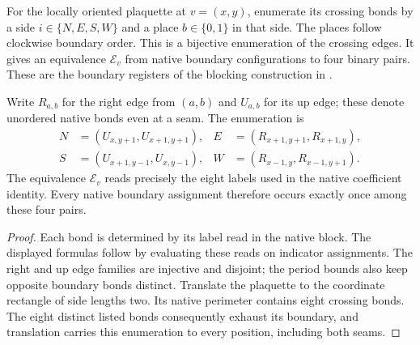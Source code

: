 \begin{definition}%
    \label{def:peps_kitaev_native_boundary_registers}
    \leanok
    For the locally oriented plaquette at $v=(x,y)$, enumerate its crossing
    bonds by a side $i\in\{N,E,S,W\}$ and a place $b\in\{0,1\}$ in that side.
    The places follow clockwise boundary order. This is a bijective
    enumeration of the crossing edges. It gives an equivalence
    $\mathcal E_v$ from native boundary configurations to four binary pairs.
    These are the boundary registers of the blocking construction in
    \cite[Section~7, ``Kitaev's code state'']{Schuch2010PEPS}.
\end{definition}

\begin{lemma}%
    \label{thm:peps_kitaev_native_boundary_registers}
    \leanok
    Write $R_{a,b}$ for the right edge from $(a,b)$ and $U_{a,b}$
    for its up edge; these denote unordered native bonds even at a seam.
    The enumeration is
    \begin{align}
        N & =(U_{x,y+1},U_{x+1,y+1}), &
        E & =(R_{x+1,y+1},R_{x+1,y}),   \\
        S & =(U_{x+1,y-1},U_{x,y-1}), &
        W & =(R_{x-1,y},R_{x-1,y+1}).
    \end{align}
    The equivalence $\mathcal E_v$ reads precisely the eight labels used
    in the native coefficient identity. Every native boundary assignment
    therefore occurs exactly once among these four pairs.
\end{lemma}

\begin{proof}\leanok
    Each bond is determined by its label read in the native block.
    The displayed formulas follow by evaluating these reads on indicator
    assignments. The right and up edge families are injective and disjoint;
    the period bounds also keep opposite boundary bonds distinct.
    Translate the plaquette to the coordinate rectangle of side lengths two.
    Its native perimeter contains eight crossing bonds. The eight distinct
    listed bonds consequently exhaust its boundary, and translation carries
    this enumeration to every position, including both seams.
\end{proof}

